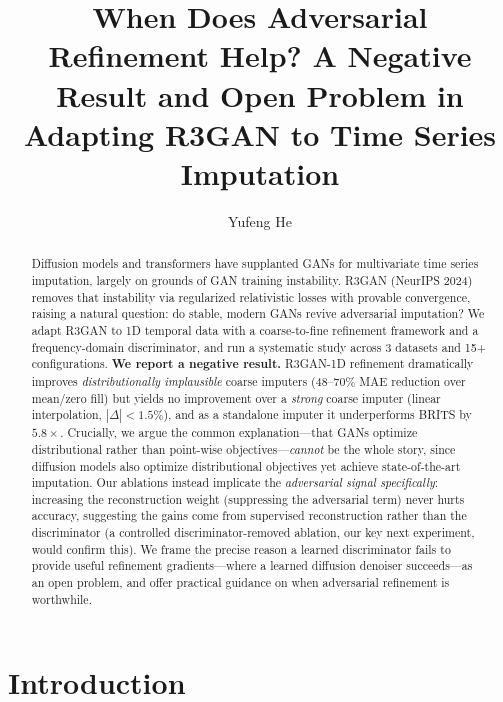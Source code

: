 \documentclass[sigconf,nonacm]{acmart}
\begin{document}
\title{When Does Adversarial Refinement Help? A Negative Result and Open Problem in Adapting R3GAN to Time Series Imputation}

\author{Yufeng He}

\begin{abstract}
Diffusion models and transformers have supplanted GANs for multivariate time series imputation, largely on grounds of GAN training instability.
R3GAN (NeurIPS 2024) removes that instability via regularized relativistic losses with provable convergence, raising a natural question: do stable, modern GANs revive adversarial imputation?
We adapt R3GAN to 1D temporal data with a coarse-to-fine refinement framework and a frequency-domain discriminator, and run a systematic study across 3 datasets and 15+ configurations.
\textbf{We report a negative result.}
R3GAN-1D refinement dramatically improves \emph{distributionally implausible} coarse imputers (48--70\% MAE reduction over mean/zero fill) but yields no improvement over a \emph{strong} coarse imputer (linear interpolation, $|\Delta|<1.5\%$), and as a standalone imputer it underperforms BRITS by $5.8\times$.
Crucially, we argue the common explanation---that GANs optimize distributional rather than point-wise objectives---\emph{cannot} be the whole story, since diffusion models also optimize distributional objectives yet achieve state-of-the-art imputation.
Our ablations instead implicate the \emph{adversarial signal specifically}: increasing the reconstruction weight (suppressing the adversarial term) never hurts accuracy, suggesting the gains come from supervised reconstruction rather than the discriminator (a controlled discriminator-removed ablation, our key next experiment, would confirm this).
We frame the precise reason a learned discriminator fails to provide useful refinement gradients---where a learned diffusion denoiser succeeds---as an open problem, and offer practical guidance on when adversarial refinement is worthwhile.
\end{abstract}


\maketitle

\section{Introduction}
\end{document}
